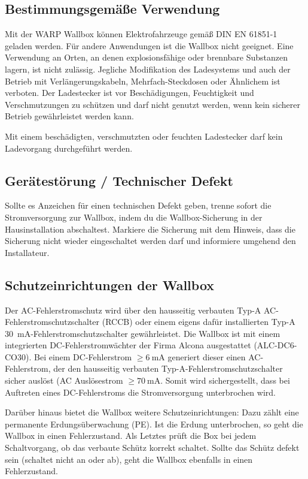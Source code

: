 \documentclass[a4paper,10pt]{article}
\newcommand{\hint}[1]{\begin{tcolorbox}[colback=boxgray,colframe=black,coltext=
white,title=Hinweis]#1\end{tcolorbox}}
\begin{document}
\begin{multicols*}{2}
	\subsection{Bestimmungsgemäße Verwendung}
	Mit der WARP Wallbox können Elektrofahrzeuge gemäß DIN EN 61851-1 geladen
	werden. Für andere Anwendungen ist die Wallbox nicht geeignet. Eine Verwendung
	an Orten, an denen explosionsfähige oder brennbare Substanzen lagern, ist nicht
	zulässig. Jegliche Modifikation des Ladesystems und auch der Betrieb mit
	Verlängerungskabeln, Mehrfach-Steckdosen oder Ähnlichem ist verboten. Der
	Ladestecker ist vor Beschädigungen, Feuchtigkeit und Verschmutzungen zu
	schützen und darf nicht genutzt werden, wenn kein sicherer Betrieb
	gewährleistet werden kann. \hint{Mit einem beschädigten, verschmutzten oder feuchten Ladestecker darf kein Ladevorgang durchgeführt
		werden.}

	\subsection{Gerätestörung / Technischer Defekt}
	Sollte es Anzeichen für einen technischen Defekt geben, trenne sofort die
	Stromversorgung zur Wallbox, indem du die Wallbox-Sicherung in der
	Hausinstallation abschaltest. Markiere die Sicherung mit dem Hinweis, dass die
	Sicherung nicht wieder eingeschaltet werden darf und informiere umgehend den
	Installateur.

	\subsection{Schutzeinrichtungen der Wallbox}
	Der AC-Fehlerstromschutz wird über den hausseitig verbauten
	Typ-A AC-Fehlerstromschutzschalter (RCCB) oder einem eigens dafür installierten
	Typ-A \SI{30}{\milli\ampere}-Fehlerstromschutzschalter gewährleistet. Die Wallbox ist
	mit einem integrierten DC-Fehlerstromwächter der Firma Alcona ausgestattet
	(ALC-DC6-CO30). Bei einem DC-Fehlerstrom $\geq \SI{6}{\milli\ampere}$ generiert dieser
	einen AC-Fehlerstrom, der den hausseitig verbauten
	Typ-A-Fehlerstromschutzschalter sicher auslöst (AC Auslösestrom
	$\geq \SI{70}{\milli\ampere}$. Somit wird sichergestellt, dass bei Auftreten eines
	DC-Fehlerstroms die Stromversorgung unterbrochen wird.

	Darüber hinaus bietet die Wallbox weitere Schutzeinrichtungen: Dazu zählt eine
	permanente Erdungsüberwachung (PE). Ist die Erdung unterbrochen, so geht die
	Wallbox in einen Fehlerzustand. Als Letztes prüft die Box bei jedem
	Schaltvorgang, ob das verbaute Schütz korrekt schaltet. Sollte das
	Schütz defekt sein (schaltet nicht an oder ab), geht die Wallbox
	ebenfalls in einen Fehlerzustand.


\end{multicols*}
\end{document}
